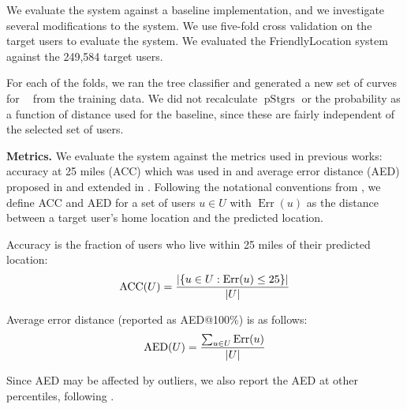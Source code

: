 \documentclass{sig-alternate}
\DeclareMathOperator{\pContact}{p^\ast}
\DeclareMathOperator{\pStrangers}{pStgrs}
\DeclareMathOperator{\Err}{Err}
\DeclareMathOperator{\AED}{AED}
\DeclareMathOperator{\ACC}{ACC}
\begin{document}
We evaluate the system against a baseline implementation, and we investigate
several modifications to the system.
%
We use five-fold cross validation on the target users to evaluate the system.
We evaluated the FriendlyLocation system against the 249,584 target users.

For each of the folds, we ran the tree classifier and generated a new set of
curves for $\pContact$ from the training data.
%
We did not recalculate $\pStrangers$ or the probability as a function of distance
used for the baseline, since these are fairly independent of the selected set
of users.

\noindent\textbf{Metrics.} We evaluate the system against the metrics used in
previous works: accuracy at 25 miles (ACC) which was used in
\cite{backstrom2010find} and average error distance (AED) proposed in
\cite{cheng2010you} and extended in \cite{li2012towards}.
%
Following the notational conventions from \cite{li2012towards}, we define ACC
and AED for a set of users $u \in U$ with $\Err(u)$ as the distance between a
target user's home location and the predicted location.

Accuracy is the fraction of users who live within 25 miles of their predicted
location:
\[
    \ACC(U) = { |\{ u \in U : \Err(u)\le25 \}| \over |U| }
\]

Average error distance (reported as AED@100\%) is as follows:
\[
    \AED(U) = { \sum_{u \in U} \Err(u) \over |U| }
\]

Since AED may be affected by outliers, we also report the AED at other
percentiles, following \cite{li2012towards}.
%
\end{document}
